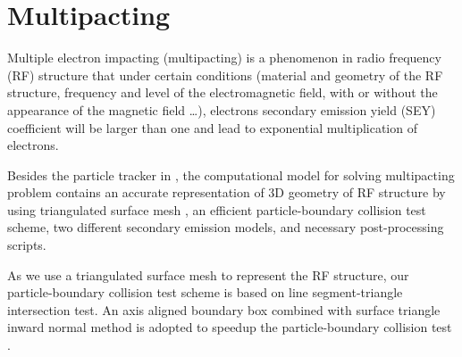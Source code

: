 

\chapter{Multipacting}
\label{chp:multpact}
Multiple electron impacting (multipacting) is a phenomenon in radio frequency (RF) structure that under certain conditions (material and geometry of the RF structure, frequency and level of the electromagnetic field, with or without the appearance of the magnetic field \ldots), electrons secondary emission yield (SEY) coefficient will be larger than one and lead to exponential multiplication of electrons.

Besides the particle tracker in \opal, the computational model for solving multipacting problem contains an accurate representation of 3D geometry of RF structure by using triangulated surface mesh , an efficient particle-boundary collision test scheme, two different secondary emission models, and necessary post-processing scripts.

As we use a triangulated surface mesh to represent the RF structure, our particle-boundary collision test scheme is based on line segment-triangle intersection test. An axis aligned boundary box combined with surface triangle inward normal method is adopted to speedup the particle-boundary collision test \cite{WangHB2010}.

